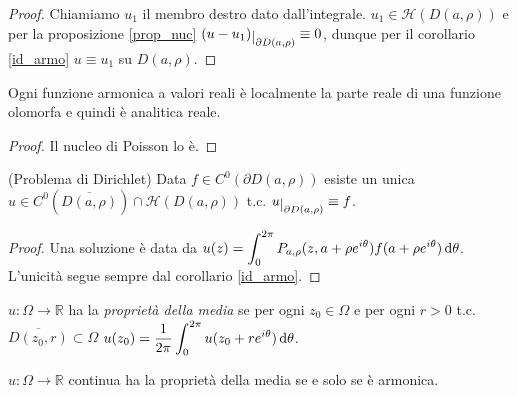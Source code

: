 \begin{proof}
  Chiamiamo $u_1$ il membro destro dato dall'integrale. $u_1 \in \mathcal{H}(D(a,\rho))$ e per la proposizione \ref{prop_nuc} $(u-u_1)\restrict{\partial D(a, \rho)} \equiv 0$, dunque per il corollario \ref{id_armo} $u \equiv u_1$ su $D(a, \rho)$.
\end{proof}

\begin{cor}
  Ogni funzione armonica a valori reali è localmente la parte reale di una funzione olomorfa e quindi è analitica reale.
\end{cor}

\begin{proof}
  Il nucleo di Poisson lo è.
\end{proof}

\begin{cor}
  (Problema di Dirichlet) Data $f \in C^0(\partial D(a,\rho))$ esiste un unica $u \in C^0(\overline{D(a,\rho)}) \cap \mathcal{H}(D(a,\rho))$ t.c. $u\restrict{\partial D(a,\rho)} \equiv f$.
\end{cor}

\begin{proof}
  Una soluzione è data da $\displaystyle u(z)=\int_0^{2\pi} P_{a,\rho}(z,a+\rho e^{i\theta})f(a+\rho e^{i\theta})\mathop{}\!\mathrm{d}\theta$. L'unicità segue sempre dal corollario \ref{id_armo}.
\end{proof}

\begin{defn}
  $u: \Omega \longrightarrow \mathbb{R}$ ha la \textit{proprietà della media} se per ogni $z_0 \in \Omega$ e per ogni $r>0$ t.c. $\overline{D(z_0,r)} \subset \Omega$ $\displaystyle u(z_0)=\frac{1}{2\pi} \int_0^{2\pi} u(z_0+re^{i\theta})\mathop{}\!\mathrm{d}\theta$.
\end{defn}

\begin{prop}
  $u:\Omega \longrightarrow \mathbb{R}$ continua ha la proprietà della media se e solo se è armonica.
\end{prop}

